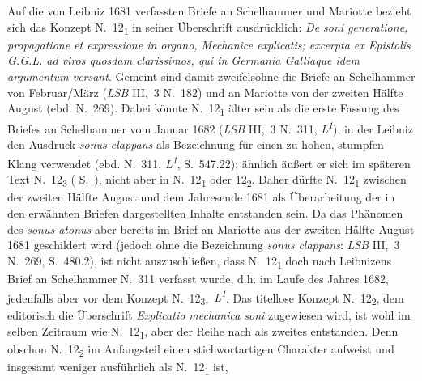\pend
\pstart%
Auf die von Leibniz 1681 verfassten Briefe an Schelhammer\protect{} und Mariotte\protect{} bezieht sich das Konzept N.~12\textsubscript{1} in seiner Überschrift ausdrücklich: \textit{De soni generatione, propagatione et expressione in organo, Mechanice explicatis; excerpta ex Epistolis G.G.L. ad viros quosdam clarissimos, qui in Germania Galliaque idem argumentum versant}.
Gemeint sind damit zweifelsohne die Briefe an Schelhammer von Februar/März (\textit{LSB} III,~3 N.~182) und an Mariotte von der zweiten Hälfte August (ebd. N.~269).
Dabei
\pend
\newpage
\pstart
\noindent könnte N.~12\textsubscript{1} älter sein als die erste Fassung des Briefes an Schelhammer vom Januar 1682 (\textit{LSB} III,~3 N.~311, \textit{L\textsuperscript{1}}), in der Leibniz den Ausdruck \textit{sonus clappans} als Bezeich\-nung für einen zu hohen, stumpfen Klang ver\-wendet (ebd. N.~311, \textit{L\textsuperscript{1}}, S.~547.22); ähnlich äußert er sich im späteren Text N.~12\textsubscript{3} (%
S.~), nicht aber in N.~12\textsubscript{1} oder 12\textsubscript{2}.
Daher dürfte N.~12\textsubscript{1} zwischen der zweiten Hälfte August und dem Jahresende 1681 als Überarbeitung der in den erwähnten Briefen dargestellten Inhalte entstanden sein.
Da das Phänomen des \textit{sonus atonus} aber bereits im Brief an Mariotte\protect{} aus der zweiten Hälfte August 1681 geschildert wird (jedoch ohne die Bezeichnung \textit{sonus clappans}: \textit{LSB} \cite{01193}III,~3 N.~269, S.~480.2), ist nicht auszuschließen, dass N.~12\textsubscript{1} doch nach Leibnizens Brief an Schelhammer N.~311 verfasst wurde, d.h. im Laufe des Jahres 1682, jedenfalls aber vor dem Konzept N.~12\textsubscript{3},~\textit{L\textsuperscript{1}}. 
\pend\pstart%
Das titellose Konzept N.~12\textsubscript{2}, dem editorisch die Überschrift \textit{Explicatio mechanica soni} zugewiesen wird, ist wohl im selben Zeitraum wie N.~12\textsubscript{1}, aber der Reihe nach als zweites entstanden.
Denn obschon N.~12\textsubscript{2} im Anfangsteil einen stichwortartigen Charakter aufweist und insgesamt weniger aus\-führlich als N.~12\textsubscript{1} ist, %

